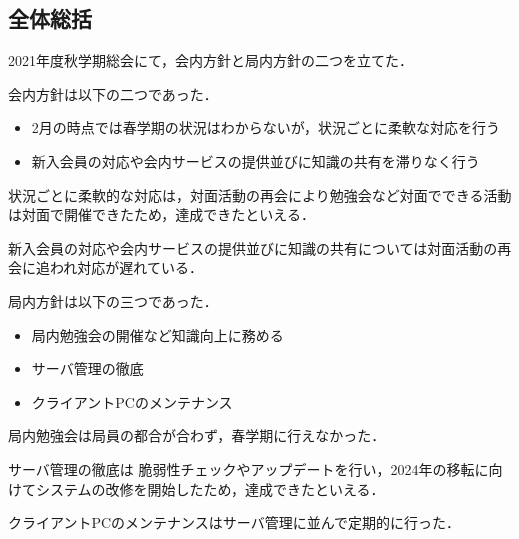 \subsection*{全体総括}


2021年度秋学期総会にて，会内方針と局内方針の二つを立てた．

会内方針は以下の二つであった．
\begin{itemize}
  \item 2月の時点では春学期の状況はわからないが，状況ごとに柔軟な対応を行う
  \item 新入会員の対応や会内サービスの提供並びに知識の共有を滞りなく行う
\end{itemize}
状況ごとに柔軟的な対応は，対面活動の再会により勉強会など対面でできる活動は対面で開催できたため，達成できたといえる．

新入会員の対応や会内サービスの提供並びに知識の共有については対面活動の再会に追われ対応が遅れている．

局内方針は以下の三つであった．
\begin{itemize}
  \item 局内勉強会の開催など知識向上に務める
  \item サーバ管理の徹底
  \item クライアントPCのメンテナンス
\end{itemize}
局内勉強会は局員の都合が合わず，春学期に行えなかった．

サーバ管理の徹底は
脆弱性チェックやアップデートを行い，2024年の移転に向けてシステムの改修を開始したため，達成できたといえる．

クライアントPCのメンテナンスはサーバ管理に並んで定期的に行った．
